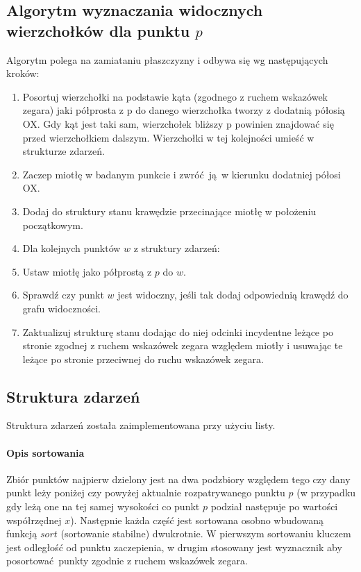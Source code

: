 \documentclass[12pt]{article}
\let\tempone\itemize
\let\temptwo\enditemize
\renewenvironment{itemize}{\tempone\setlength{\itemsep}{0cm}}{\temptwo}
\begin{document}
	\subsection{Algorytm wyznaczania widocznych wierzchołków dla punktu $ p $} \label{sssec:algo}
		Algorytm polega na zamiataniu płaszczyzny i odbywa się wg następujących kroków:
		\begin{enumerate}
			\item Posortuj wierzchołki na podstawie kąta (zgodnego z ruchem wskazówek zegara) jaki półprosta z p do danego wierzchołka tworzy z dodatnią półosią OX. Gdy kąt jest taki sam, wierzchołek bliższy p powinien znajdować się przed wierzchołkiem dalszym. Wierzchołki w tej kolejności umieść w strukturze zdarzeń.
			\item Zaczep miotłę w badanym punkcie i zwróć ją w kierunku dodatniej półosi OX.
			\item Dodaj do struktury stanu krawędzie przecinające miotłę w położeniu początkowym.
			\item Dla kolejnych punktów $ w $ z struktury zdarzeń:
			\begin{itemize}
				\item Ustaw miotłę jako półprostą z $ p $ do $ w $.
				\item Sprawdź czy punkt $ w $ jest widoczny, jeśli tak dodaj odpowiednią krawędź do grafu widoczności.
				\item Zaktualizuj strukturę stanu dodając do niej odcinki incydentne leżące po stronie zgodnej z ruchem wskazówek zegara względem miotły i usuwając te leżące po stronie przeciwnej do ruchu wskazówek zegara.
			\end{itemize}
		\end{enumerate}
	
		\subsection{Struktura zdarzeń}
			Struktura zdarzeń została zaimplementowana przy użyciu listy. 
			
			\paragraph{Opis sortowania}
				Zbiór punktów najpierw dzielony jest na dwa podzbiory względem tego czy dany punkt leży poniżej czy powyżej aktualnie rozpatrywanego punktu $ p $ (w przypadku gdy leżą one na tej samej wysokości co punkt $ p $ podział następuje po wartości współrzędnej $ x $). Następnie każda część jest sortowana osobno wbudowaną funkcją $ sort $ (sortowanie stabilne) dwukrotnie. W pierwszym sortowaniu kluczem jest odległość od punktu zaczepienia, w drugim stosowany jest wyznacznik aby posortować punkty zgodnie z ruchem wskazówek zegara.
			
\end{document}
